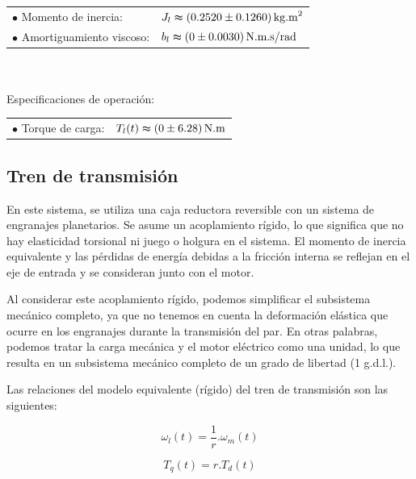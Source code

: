 \documentclass{article}
\begin{document}
    \begin{tabular}{@{} p{} p{} @{}}
        \(\bullet\) Momento de inercia: & \(J_l \thickapprox (0.2520 \pm 0.1260) \, \text{kg.m}^2\) \\
        \(\bullet\) Amortiguamiento viscoso: & \(b_l \thickapprox (0 \pm 0.0030) \, \text{N.m.s/rad}\)
    \end{tabular}
    \\\\
    \noindent Especificaciones de operación:\\

    \begin{tabular}{@{} p{} p{} @{}}
        \(\bullet\) Torque de carga: & \(T_l(t) \thickapprox (0 \pm 6.28) \, \text{N.m}\)
    \end{tabular}
    

\subsection{Tren de transmisión}

    En este sistema, se utiliza una caja reductora reversible con un sistema de engranajes planetarios. Se 
    asume un acoplamiento rígido, lo que significa que no hay elasticidad torsional ni 
    juego o holgura en el sistema. El momento de inercia equivalente y las pérdidas de energía debidas a la 
    fricción interna se reflejan en el eje de entrada y se consideran junto con el motor.

    Al considerar este acoplamiento rígido, podemos simplificar el subsistema mecánico completo, ya que no 
    tenemos en cuenta la deformación elástica que ocurre en los engranajes durante la transmisión del par. 
    En otras palabras, podemos tratar la carga mecánica y el motor eléctrico como una unidad, lo que resulta 
    en un subsistema mecánico completo de un grado de libertad (1 g.d.l.).

    Las relaciones del modelo equivalente (rígido) del tren de transmisión son las siguientes:

    \begin{equation}\label{eq:tren_de_transmision1}
        \omega_{l}(t) = \frac{1}{r}.\omega_{m}(t)
    \end{equation}
    
    \begin{equation}\label{eq:tren_de_transmision2}
        T_{q}(t) = r.T_{d}(t)
    \end{equation}
\end{document}
